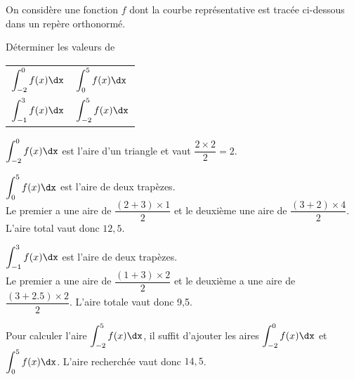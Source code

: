 \documentclass[11pt,fleqn, openany]{book} %
\begin{document}
\begin{exercise}
On considère une fonction $f$ dont la courbe représentative est tracée ci-dessous dans un repère orthonormé.

\begin{minipage}{0.55\linewidth}
Déterminer les valeurs de 
\vskip10pt
\renewcommand{\arraystretch}{2.5}
\begin{tabularx}{\linewidth}{XX}$\displaystyle\int_{-2}^0f(x)\dx$ & $\displaystyle\int_{0}^5f(x)\dx$ \\ $\displaystyle\int_{-1}^3f(x)\dx$ & $\displaystyle\int_{-2}^5f(x)\dx$\end{tabularx}

\end{minipage}\hfill\begin{minipage}{0.4\linewidth}
\end{minipage}


\end{exercise}

\begin{solution}
 \(\displaystyle\int_{-2}^0f(x)\dx\) est l'aire d'un triangle et vaut \(\dfrac{2 \times 2}{2}=2\).

 \(\displaystyle\int_{0}^5f(x)\dx\) est l'aire de deux trapèzes. \\Le premier a une aire de \(\dfrac{(2+3)\times 1}{2}\) et le deuxième une aire de \(\dfrac{(3+2)\times 4}{2}\). L'aire total vaut donc \(12,5\).


 \(\displaystyle\int_{-1}^3f(x)\dx\) est l'aire de deux trapèzes. \\Le premier a une aire de \(\dfrac{(1+3) \times 2}{2}\) et le deuxième a une aire de \(\dfrac{(3+2.5)\times 2}{2}\). L'aire totale vaut donc 9,5.

 Pour calculer l'aire \(\displaystyle\int_{-2}^5f(x)\dx\), il suffit d'ajouter les aires \(\displaystyle\int_{-2}^0f(x)\dx\) et \(\displaystyle\int_{0}^5f(x)\dx\). L'aire recherchée vaut donc \(14,5\).\end{solution}
\end{document}
